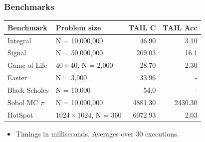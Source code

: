 \documentclass{beamer}
\begin{document}

\begin{frame}
\frametitle{Benchmarks}

\begin{tabular}{llrr}
\textbf{Benchmark} & \textbf{Problem size} & \textbf{TAIL C} & \textbf{TAIL Acc} \\
\midrule
Integral       & N = 10,000,000 &  46.90 &    3.10 \\
Signal         & N = 50,000,000 & 209.03 &   16.1  \\
Game-of-Life   & $40\times 40$, N = 2,000 &  28.70 & 2.30 \\
Easter         & N = 3,000 &   33.96 &         -  \\
Black-Scholes  & N = 10,000&    54.0 &      -     \\
Sobol MC $\pi$ & N = 10,000,000  & 4881.30  &   2430.30   \\
HotSpot        & $1024\times 1024$, N = 360 &    6072.93 &   2.03
\end{tabular}

\vspace{1cm}

\begin{itemize}
\item Timings in milliseconds. Averages over 30 executions.
\end{itemize}

\end{frame}




\end{document}
